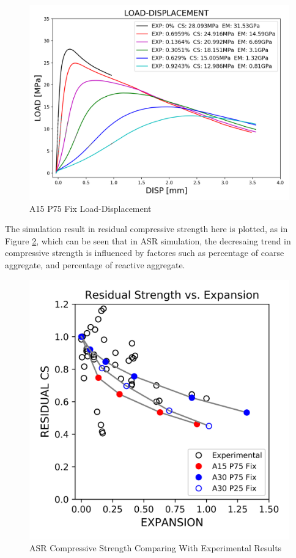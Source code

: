 \begin{figure}[ht]
\centering
\includegraphics[width=.8\linewidth]{Files/exp_3D/ASR/S13A15P75FIX-LOAD-DISPLACEMENT.png}
  \caption{A15 P75 Fix Load-Displacement}
  \label{fig:A15P75FIX_LD}
\end{figure}

\clearpage

The simulation result in residual compressive strength here is plotted, as in Figure \ref{ASR_CS_summary}, which can be seen that in ASR simulation, the decresaing trend in compressive strength is influenced by factores such as percentage of coarse aggregate, and percentage of reactive aggregate.

\begin{figure}[ht!]
\centering
\includegraphics[width=.8\linewidth]{Files/CS_plot/ASRCS_all.png}
  \caption{ASR Compressive Strength Comparing With Experimental Results}
  \label{ASR_CS_summary}
\end{figure}

